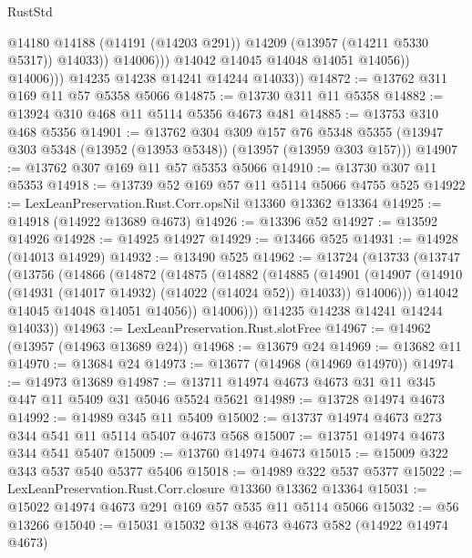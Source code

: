 \begin{lexlean}{RustStd}
\begin{coremodule}
                            @14180
                            @14188
                            (@14191 (@14203 @291))
                            @14209
                            (@13957 (@14211 @5330 @5317))
                            @14033))
                        @14006)))
                  @14042
                  @14045
                  @14048
                  @14051
                  @14056))
              @14006)))
        @14235
        @14238
        @14241
        @14244
        @14033))
@14872 := @13762 @311 @169 @11 @57 @5358 @5066
@14875 := @13730 @311 @11 @5358
@14882 := @13924 @310 @468 @11 @5114 @5356 @4673 @481
@14885 := @13753 @310 @468 @5356
@14901 := @13762
    @304
    @309
    @157
    @76
    @5348
    @5355
    (@13947 @303 @5348 (@13952 (@13953 @5348)) (@13957 (@13959 @303 @157)))
@14907 := @13762 @307 @169 @11 @57 @5353 @5066
@14910 := @13730 @307 @11 @5353
@14918 := @13739 @52 @169 @57 @11 @5114 @5066 @4755 @525
@14922 := LexLeanPreservation.Rust.Corr.opsNil @13360 @13362 @13364
@14925 := @14918 (@14922 @13689 @4673)
@14926 := @13396 @52
@14927 := @13592 @14926
@14928 := @14925 @14927
@14929 := @13466 @525
@14931 := @14928 (@14013 @14929)
@14932 := @13490 @525
@14962 := @13724
    (@13733
      (@13747
        (@13756
          (@14866
            (@14872
              (@14875
                (@14882
                  (@14885
                    (@14901
                      (@14907
                        (@14910 (@14931 (@14017 @14932) (@14022 (@14024 @52)) @14033))
                        @14006)))
                  @14042
                  @14045
                  @14048
                  @14051
                  @14056))
              @14006)))
        @14235
        @14238
        @14241
        @14244
        @14033))
@14963 := LexLeanPreservation.Rust.slotFree
@14967 := @14962 (@13957 (@14963 @13689 @24))
@14968 := @13679 @24
@14969 := @13682 @11
@14970 := @13684 @24
@14973 := @13677 (@14968 (@14969 @14970))
@14974 := @14973 @13689
@14987 := @13711 @14974 @4673 @4673 @31 @11 @345 @447 @11 @5409 @31 @5046 @5524 @5621
@14989 := @13728 @14974 @4673
@14992 := @14989 @345 @11 @5409
@15002 := @13737 @14974 @4673 @273 @344 @541 @11 @5114 @5407 @4673 @568
@15007 := @13751 @14974 @4673 @344 @541 @5407
@15009 := @13760 @14974 @4673
@15015 := @15009 @322 @343 @537 @540 @5377 @5406
@15018 := @14989 @322 @537 @5377
@15022 := LexLeanPreservation.Rust.Corr.closure @13360 @13362 @13364
@15031 := @15022 @14974 @4673 @291 @169 @57 @535 @11 @5114 @5066
@15032 := @56 @13266
@15040 := @15031 @15032 @138 @4673 @4673 @582 (@14922 @14974 @4673)

\end{coremodule}
\end{lexlean}
